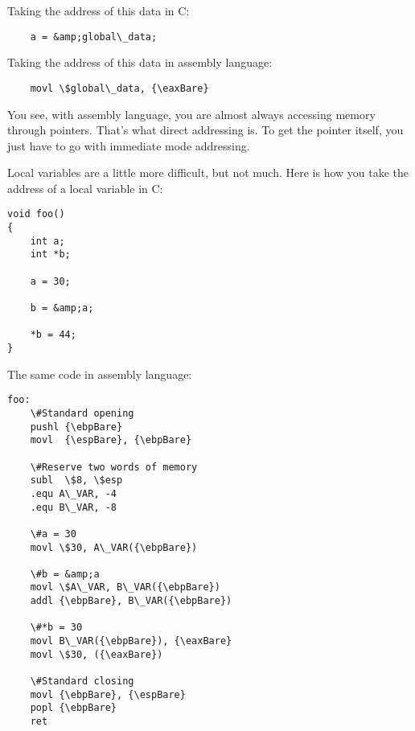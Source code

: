 Taking the address of this data in C:

\begin{simpletyping}
\begin{lstlisting}
	a = &amp;global\_data;
\end{lstlisting}
\end{simpletyping}

Taking the address of this data in assembly language:

\begin{simpletyping}
\begin{lstlisting}
	movl \$global\_data, {\eaxBare}
\end{lstlisting}
\end{simpletyping}

You see, with assembly language, you are almost always accessing memory 
through pointers.  That's what direct addressing is.  To get the pointer
itself, you just have to go with immediate mode addressing.

Local variables are a little more difficult, but not much.  Here is
how you take the address of a local variable in C:

\begin{simpletyping}
\begin{lstlisting}
void foo()
{
	int a;
	int *b;

	a = 30;

	b = &amp;a;

	*b = 44;
}
\end{lstlisting}
\end{simpletyping}

The same code in assembly language:

\begin{simpletyping}
\begin{lstlisting}
foo:
	\#Standard opening
	pushl {\ebpBare}
	movl  {\espBare}, {\ebpBare}

	\#Reserve two words of memory
	subl  \$8, \$esp
	.equ A\_VAR, -4
	.equ B\_VAR, -8

	\#a = 30
	movl \$30, A\_VAR({\ebpBare})

	\#b = &amp;a
	movl \$A\_VAR, B\_VAR({\ebpBare})
	addl {\ebpBare}, B\_VAR({\ebpBare})

	\#*b = 30
	movl B\_VAR({\ebpBare}), {\eaxBare}
	movl \$30, ({\eaxBare})

	\#Standard closing
	movl {\ebpBare}, {\espBare}
	popl {\ebpBare}
	ret
\end{lstlisting}
\end{simpletyping}

